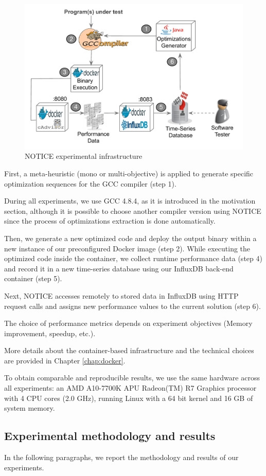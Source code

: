 \begin{figure}[h]
	\centering
	\includegraphics[width=0.8\linewidth]{chapitre3/fig/infraup.pdf}
	\caption{NOTICE experimental infrastructure}
	\label{settttini}	
\end{figure}


First, a meta-heuristic (mono or multi-objective) is applied to generate specific optimization sequences for the GCC compiler (step 1).

During all experiments, we use GCC 4.8.4, as it is introduced in the motivation section, although it is possible to choose another compiler version using NOTICE since the process of optimizations extraction is done automatically. 

Then, we generate a new optimized code and deploy the output binary within a new instance of our preconfigured Docker image (step 2). While executing the optimized code inside the container, we collect runtime performance data (step 4) and record it in a new time-series database using our InfluxDB back-end container (step 5). 

Next, NOTICE accesses remotely to stored data in InfluxDB using HTTP request calls and assigns new performance values to the current solution (step 6). 

The choice of performance metrics depends on experiment objectives (Memory improvement, speedup, etc.).

More details about the container-based infrastructure and the technical choices are provided in Chapter \ref{chap:docker}.

To obtain comparable and reproducible results, we use the same hardware across all experiments: an AMD A10-7700K APU Radeon(TM) R7 Graphics processor with 4 CPU cores (2.0 GHz), running Linux with a 64 bit kernel and 16 GB of system memory.


\subsection{Experimental methodology and results}
In the following paragraphs, we report the methodology and results of our experiments.

